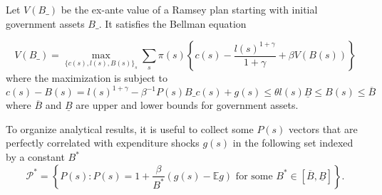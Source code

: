 \documentclass[thmsb,11pt]{article}
\begin{document}

Let $V(B\_)$ be the ex-ante value of  a Ramsey plan starting with initial government assets $B\_$. It satisfies the Bellman equation

\begin{equation}
  \label{eq-QLRA obj}
    V(B\_)=\max_{\{c(s),l(s),B(s)\}_s} \sum_{s}\pi(s)\left\{c(s)-\frac{l(s)^{1+\gamma}}{1+\gamma}+\beta V(B(s)) \right\}
\end{equation}
where the maximization is subject to
   \begin{subequations}
   \label{sys- QLRA constraint}
    \begin{equation}
    \label{rep agent implementability constraint}
    c(s)-B(s)=l(s)^{1+\gamma}-\beta^{-1} P(s)B\_
    \end{equation}
\begin{equation}
  \label{eq-resoruces}
c(s)+g(s)\leq\theta l(s)
\end{equation}
\begin{equation}
  \label{ndl}
\underline{B}\leq B(s)\leq \overline{B}
\end{equation}
   \end{subequations}
where $\overline{B}$ and $\underline{B}$ are upper and lower bounds for government assets.

To organize analytical results, it is useful to  collect some  $P(s)$ vectors that are perfectly correlated with expenditure shocks $g(s)$ in the
following  set %
 indexed by a constant $B^*$  %
\begin{equation}\label{eqn:setP}
 \mathcal{P}^*=\left\{P(s): P(s) = 1+ \frac{\beta}{ B^*}(g(s) - \mathbb{E} g) \text{ for some } B^*\in[\overline{B},\underline{B}] \right\}.
 \end{equation}

\end{document}
